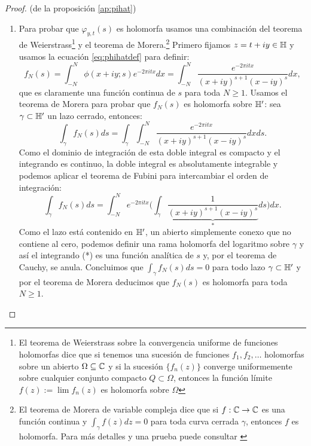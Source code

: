 \documentclass[../../tesis_maestria]{subfiles}
\begin{document}
\begin{proof}(de la proposici\'on \ref{ap:pihat})
\begin{enumerate}[label=\emph{\roman*})]
\item    
  Para probar que $\varphi_{y,t}(s)$ es holomorfa usamos una combinaci\'on del teorema de
  Weierstrass\footnote{El teorema de Weierstrass sobre la convergencia uniforme de funciones
    holomorfas dice que si tenemos una sucesi\'on de funciones $f_1,f_2,\ldots$ holomorfas sobre
    un abierto $\Omega\subseteq\mathbb{C}$ y si la sucesi\'on $\{f_n(z)\}$ converge uniformemente sobre
    cualquier conjunto compacto $Q\subset\Omega$, entonces la funci\'on l\'imite $f(z):=\lim f_n(z)$
    es holomorfa sobre $\Omega$} y el teorema de Morera.\footnote{
    El teorema de Morera de variable compleja dice que si $f:\mathbb{C}\rightarrow\mathbb{C}$ es una funci\'on continua
    y $\int_{\gamma}f(z)dz=0$ para toda curva cerrada $\gamma$, entonces $f$ es holomorfa. Para m\'as
    detalles y una prueba puede consultar \cite{AhlforsCA}}
  Primero fijamos $z=t+iy\in\mathbb{H}$ y usamos la ecuaci\'on \eqref{eq:phihatdef} para definir:
  \[
    f_N(s)=
    \int_{-N}^{N}\phi(x+iy;s)e^{-2\pi i tx}dx=
    \int_{-N}^{N}\frac{e^{-2\pi i tx}}{(x+iy)^{s+1}(x-iy)^s}dx,
  \]
  que es claramente una funci\'on continua de $s$ para toda $N\geq1$. Usamos el teorema de Morera para
  probar que $f_N(s)$ es holomorfa sobre $\mathbb{H}'$: sea $\gamma\subset\mathbb{H}'$ un lazo cerrado, entonces:
  \[
    \int_{\gamma}f_N(s)ds=\int_{\gamma}\int_{-N}^{N}\frac{e^{-2\pi i tx}}{(x+iy)^{s+1}(x-iy)^s}dxds.
  \]
  Como el dominio de integraci\'on de esta doble integral es compacto y el integrando es continuo,
  la doble integral es absolutamente integrable y podemos aplicar el teorema de Fubini para
  intercambiar el orden de integraci\'on:
  \[
    \int_{\gamma}f_N(s)ds=
    \int_{-N}^{N}e^{-2\pi i tx}
    \Big(\int_{\gamma}\underset{*}{\underbrace{\frac{1}{(x+iy)^{s+1}(x-iy)^s}}}ds\Big)dx.
  \]
  Como el lazo est\'a contenido en $\mathbb{H}'$, un abierto simplemente conexo que no contiene al cero,
  podemos definir una rama holomorfa del logaritmo sobre $\gamma$ y as\'i el integrando (*) es una
  funci\'on anal\'itica de $s$ y, por el teorema de Cauchy, se anula. Concluimos
  que $\int_{\gamma}f_N(s)ds=0$ para todo lazo $\gamma\subset\mathbb{H}'$ y por el teorema de Morera deducimos
  que $f_N(s)$ es holomorfa para toda $N\geq1$.


\end{enumerate}
\end{proof}
\end{document}
